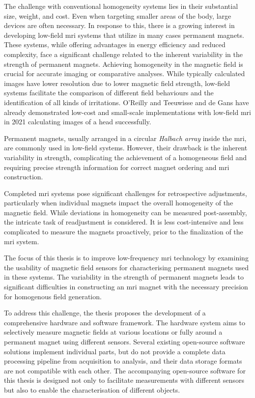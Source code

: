 The challenge with conventional homogeneity systems lies in their
substantial size, weight, and cost. Even when targeting smaller areas of
the body, large devices are often necessary. In response to this, there
is a growing interest in developing low-field \gls{mri} systems that
utilize in many cases permanent magnets. These systems, while offering
advantages in energy efficiency and reduced complexity, face a
significant challenge related to the inherent variability in the
strength of permanent magnets. Achieving homogeneity in the magnetic
field is crucial for accurate imaging or comparative analyses. While
typically calculated images have lower resolution due to lower magnetic
field strength, low-field systems facilitate the comparison of different
field behaviours and the identification of all kinds of irritations.
O'Reilly and Teeuwisse and de Gans  have already
demonstrated low-cost and small-scale implementations with low-field
\gls{mri} in 2021 calculating images of a head successfully.

Permanent magnets, usually arranged in a circular \emph{Halbach array}
inside the \gls{mri}, are commonly used in low-field systems. However,
their drawback is the inherent variability in strength, complicating the
achievement of a homogeneous field and requiring precise strength
information for correct magnet ordering and \gls{mri} construction.

Completed \gls{mri} systems pose significant challenges for
retrospective adjustments, particularly when individual magnets impact
the overall homogeneity of the magnetic field. While deviations in
homogeneity can be measured post-assembly, the intricate task of
readjustment is considered. It is less cost-intensive and less
complicated to measure the magnets proactively, prior to the
finalization of the \gls{mri} system.

The focus of this thesis is to improve low-frequency \gls{mri}
technology by examining the usability of magnetic field sensors for
characterising permanent magnets used in these systems. The variability
in the strength of permanent magnets leads to significant difficulties
in constructing an \gls{mri} magnet with the necessary precision for
homogenous field generation.

To address this challenge, the thesis proposes the development of a
comprehensive hardware and software framework. The hardware system aims
to selectively measure magnetic fields at various locations or fully
around a permanent magnet using different sensors. Several existing
open-source software solutions implement individual parts, but do not
provide a complete data processing pipeline from acquisition to
analysis, and their data storage formats are not compatible with each
other. The accompanying open-source software for this thesis is designed
not only to facilitate measurements with different sensors but also to
enable the characterisation of different objects.

